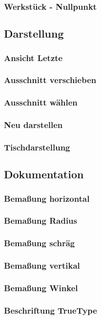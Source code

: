\documentclass[a5paper]{book}
\begin{document}
			\subsubsection{Werkstück - Nullpunkt} 
		\subsection{Darstellung}
			\subsubsection{Ansicht Letzte} 
			\subsubsection{Ausschnitt verschieben} 
			\subsubsection{Ausschnitt wählen} 
			\subsubsection{Neu darstellen} 
			\subsubsection{Tischdarstellung} 
		\subsection{Dokumentation}
			\subsubsection{Bemaßung horizontal} 
			\subsubsection{Bemaßung Radius} 
			\subsubsection{Bemaßung schräg} 
			\subsubsection{Bemaßung vertikal} 
			\subsubsection{Bemaßung Winkel} 
			\subsubsection{Beschriftung TrueType} 
\end{document}
